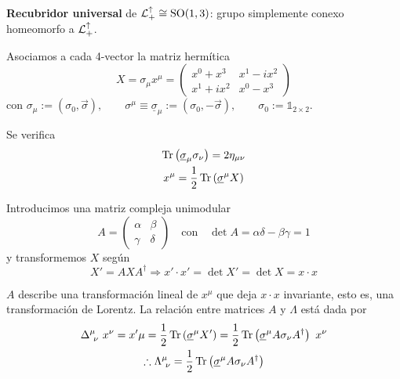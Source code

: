 \begin{flushleft}
\textbf{Recubridor universal} de $\mathcal{L}_+^\uparrow \cong\mathrm{SO}(1,3)$: grupo simplemente conexo homeomorfo a 
$\mathcal{L}_+^\uparrow$. 
\end{flushleft}

Asociamos a cada 4-vector la matriz hermítica
\begin{equation}
X=\sigma_\mu x^\mu =\begin{pmatrix}
x^0+x^3& x^1-ix^2\\
x^1+ix^2&x^0-x^3
\end{pmatrix}\label{matriz_X_Lorentz}
\end{equation}
con $\sigma_\mu:=(\sigma_0,\vec{\sigma}),\qquad\sigma^\mu\equiv \underline{\sigma}_\mu:=(\sigma_0,-\vec{\sigma}),\qquad\sigma_0:=\mathbb{1}_{2\times 2}$. \medskip


Se verifica
\begin{gather}
\operatorname{Tr}\left(\underline{\sigma}_\mu \sigma_\nu\right)=2\eta_{\mu\nu}\\
x^\mu=\frac{1}{2}\operatorname{Tr}\left(\underline{\sigma}^\mu X\right)
\end{gather}


Introducimos una matriz compleja unimodular
\begin{equation}
A=\begin{pmatrix}
\alpha &\beta \\
\gamma &\delta
\end{pmatrix}  \quad \text{con}\quad \det A=\alpha\delta-\beta\gamma=1
\label{matrices_A_Lorentz}
\end{equation}
 y transformemos $X$ según
\begin{equation}
X'=AXA^\dagger\Rightarrow x'\cdot x'=\det X'=\det X= x\cdot x
\end{equation}

$A$ describe una transformación lineal de $x^\mu$ que deja $x\cdot x$ invariante, esto es, una transformación de Lorentz. La relación entre matrices $A$ y $\Lambda$ está dada por
\begin{gather}
\Delta^\mu_{\ \nu}\  x^\nu= x'\mu=\frac{1}{2} \operatorname{Tr}\left(\underline{\sigma}^\mu X'\right)= \frac{1}{2}\operatorname{Tr}\left(\underline{\sigma}^\mu A \sigma_\nu A^\dagger \right)\ x^\nu \\
\therefore \Lambda^\mu_{\ \nu}= \frac{1}{2}\operatorname{Tr}\left(\underline{\sigma}^\mu A \sigma_\nu A^\dagger \right)
\end{gather}


